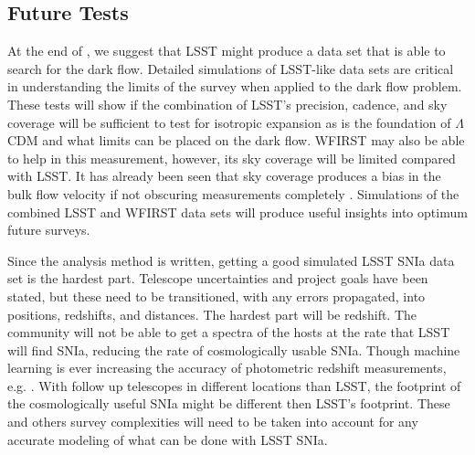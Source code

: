 \documentclass[apj, iop]{emulateapj}
\newcommand{\sn}{SNIa}
\newcommand{\todo}[1]{\textbf{\textcolor{red}{#1}}}
\newcommand{\lcdm}{$\Lambda$CDM}     %
\begin{document}
\subsection{Future Tests}\label{future-tests}

At the end of \cite{Mathews16}, we suggest that LSST might produce a data set
that is able to search for the dark flow. Detailed simulations of LSST-like data
sets are critical in understanding the limits of the survey when applied to the
dark flow problem. These tests will show if the combination of LSST's precision,
cadence, and sky coverage will be sufficient to test for isotropic expansion as
is the foundation of \lcdm{} and what limits can be placed on the dark flow.
WFIRST may also be able to help in this measurement, however, its sky coverage
will be limited compared with LSST. It has already been seen that sky coverage
produces a bias in the bulk flow velocity \citep{Appleby14} if not obscuring
measurements completely \citep{Mathews16}. Simulations of the combined LSST and
WFIRST data sets will produce useful insights into optimum future surveys.

Since the analysis method is written, getting a good simulated LSST \sn{} data
set is the hardest part. Telescope uncertainties and project goals have been
stated, but these need to be transitioned, with any errors propagated, into
positions, redshifts, and distances. The hardest part will be redshift. The
community will not be able to get a spectra of the hosts at the rate that LSST
will find \sn, reducing the rate of cosmologically usable \sn. Though machine
learning is ever increasing the accuracy of photometric redshift measurements,
e.g. \cite{Kind13}. With follow up telescopes in different locations than
LSST, the footprint of the cosmologically useful \sn{} might be different then
LSST's footprint. These and others survey complexities will need to be taken
into account for any accurate modeling of what can be done with LSST \sn{}.
\end{document}
